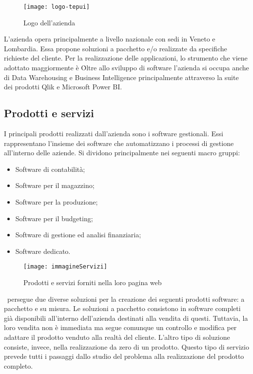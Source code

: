 \begin{figure}[!h] 
	\centering 
	\texttt{[image: logo-tepui]} 
	\caption{Logo dell'azienda}
\end{figure}

L'azienda opera principalmente a livello nazionale con sedi in Veneto e Lombardia. Essa propone soluzioni a pacchetto e/o realizzate da specifiche richieste del cliente. Per la realizzazione delle applicazioni, lo strumento che viene adottato maggiormente è \inde\.
Oltre allo sviluppo di software l'azienda si occupa anche di Data Warehousing e Business Intelligence principalmente attraverso la suite dei prodotti Qlik e Microsoft Power BI.

\subsection{Prodotti e servizi}
\label{cap1:Prodotti e servizi}
I principali prodotti realizzati dall'azienda sono i software gestionali. Essi rappresentano l'insieme dei software che automatizzano i processi di gestione all'interno delle aziende. Si dividono principalmente nei seguenti macro gruppi:
\begin{itemize}
	\item Software di contabilità;
	\item Software per il magazzino;
	\item Software per la produzione;
	\item Software per il budgeting;
	\item Software di gestione ed analisi finanziaria;
	\item Software dedicato.
\end{itemize}

\begin{figure}[!h] 
	\centering 
	\texttt{[image: immagineServizi]} 
	\caption{Prodotti e servizi forniti nella loro pagina web}
\end{figure}

\azienda\ persegue due diverse soluzioni per la creazione dei seguenti prodotti software: a pacchetto e su misura. Le soluzioni a pacchetto consistono in software completi già disponibili all'interno dell'azienda destinati alla vendita di questi. Tuttavia, la loro vendita non è immediata ma segue comunque un controllo e modifica per adattare il prodotto venduto alla realtà del cliente. L'altro tipo di soluzione consiste, invece, nella realizzazione da zero di un prodotto. Questo tipo di servizio prevede tutti i passaggi dallo studio del problema alla realizzazione del prodotto completo.

